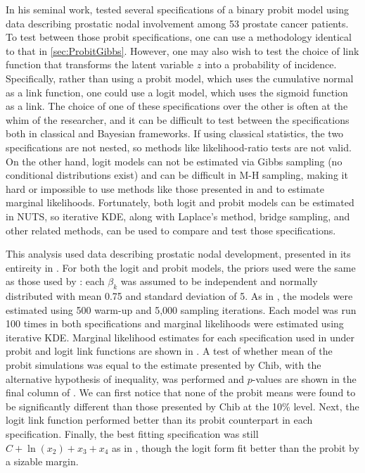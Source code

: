 \documentclass[twocolumn]{article}
\begin{document}


In his seminal work, \cite{Chib} tested several specifications of a binary probit model using data describing prostatic nodal involvement among 53 prostate cancer patients. To test between those probit specifications, one can use a methodology identical to that in \cref{sec:ProbitGibbs}. However, one may also wish to test the choice of link function that transforms the latent variable $z$ into a probability of incidence. Specifically, rather than using a probit model, which uses the cumulative normal as a link function, one could use a logit model, which uses the sigmoid function as a link. The choice of one of these specifications over the other is often at the whim of the researcher, and it can be difficult to test between the specifications both in classical and Bayesian frameworks. If using classical statistics, the two specifications are not nested, so methods like likelihood-ratio tests are not valid. On the other hand, logit models can not be estimated via Gibbs sampling (no conditional distributions exist) and can be difficult in M-H sampling, making it hard or impossible to use methods like those presented in \cite{Chib} and \cite{ChibJeliazkov} to estimate marginal likelihoods. Fortunately, both logit and probit models can be estimated in NUTS, so iterative KDE, along with Laplace's method, bridge sampling, and other related methods, can be used to compare and test those specifications.

This analysis used data describing prostatic nodal development, presented in its entireity in \cite{Chib}. For both the logit and probit models, the priors used were the same as those used by \cite{Chib}: each $\beta_k$ was assumed to be independent and normally distributed with mean 0.75 and standard deviation of 5. As in \cite{Chib}, the models were estimated using 500 warm-up and 5,000 sampling iterations. Each model was run 100 times in both specifications and marginal likelihoods were estimated using iterative KDE. Marginal likelihood estimates for each specification used in \cite{Chib} under probit and logit link functions are shown in . A test of whether mean of the probit simulations was equal to the estimate presented by Chib, with the alternative hypothesis of inequality, was performed and $p$-values are shown in the final column of . We can first notice that none of the probit means were found to be significantly different than those presented by Chib at the 10\% level. Next, the logit link function performed better than its probit counterpart in each specification. Finally, the best fitting specification was still $C + \ln(x_2) + x_3 + x_4$ as in \cite{Chib}, though the logit form fit better than the probit by a sizable margin.
\end{document}
